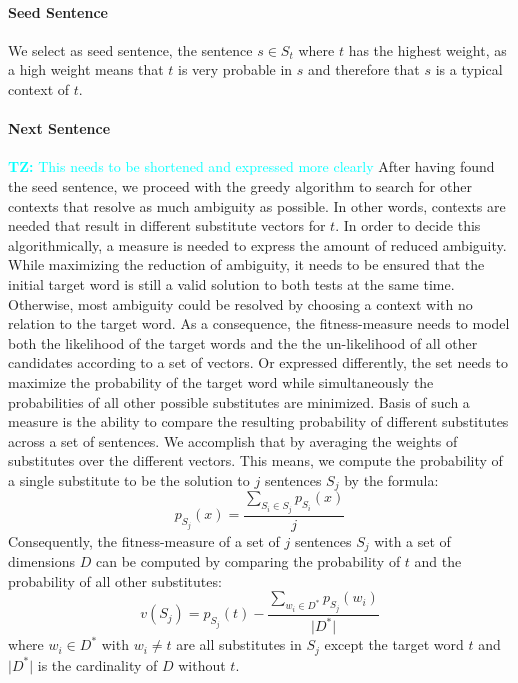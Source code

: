 \documentclass[11pt,letterpaper]{article}
\newcommand{\tz}[1]{\textcolor{cyan}{\textbf{TZ:} #1}}
\newcommand{\tz}[1]{}
\begin{document}
\paragraph{Seed Sentence}
We select as seed sentence, the sentence $s \in S_t$ where $t$ has the highest weight, as a high weight means that $t$ is very probable in $s$ and therefore that $s$ is a typical context of $t$. 

\paragraph{Next Sentence}
\tz{This needs to be shortened and expressed more clearly}
After having found the seed sentence, we proceed with the greedy algorithm to search for other contexts that resolve as much ambiguity as possible.
In other words, contexts are needed that result in different substitute vectors for $t$.
In order to decide this algorithmically, a measure is needed to express the amount of reduced ambiguity.
While maximizing the reduction of ambiguity, it needs to be ensured that the initial target word is still a valid solution to both tests at the same time.
Otherwise, most ambiguity could be resolved by choosing a context with no relation to the target word.
As a consequence, the fitness-measure needs to model both the likelihood of the target words and the the un-likelihood of all other candidates according to a set of vectors.
Or expressed differently, the set needs to maximize the probability of the target word while simultaneously the probabilities of all other possible substitutes are minimized. 
Basis of such a measure is the ability to compare the resulting probability of different substitutes across a set of sentences.
We accomplish that by averaging the weights of substitutes over the different vectors.
This means, we compute the probability of a single substitute to be the solution to $j$ sentences $S_j$ by the formula:
\begin{equation}
\label{eq:coreMeasure}
	p_{S_j}(x)=\dfrac{\sum\nolimits_{S_i \in S_j}p_{S_i}(x)}{j} 
\end{equation}
Consequently, the fitness-measure of a set of $j$ sentences $S_j$ with a set of dimensions $D$ can be computed by comparing the probability of $t$ and the probability of all other substitutes: 
\begin{equation}
\label{eq:coreMeasure}
	v(S_j)=p_{S_j}(t)-\dfrac{\sum\nolimits_{w_i \in D^*}p_{S_j}(w_{i})}{\vert D^* \vert} 
\end{equation}
	where $w_i \in D^*$ with $w_i \neq t$ are all substitutes in $S_j$ except the target word $t$ and $\vert D^* \vert$ is the cardinality of $D$ without $t$.
\end{document}
